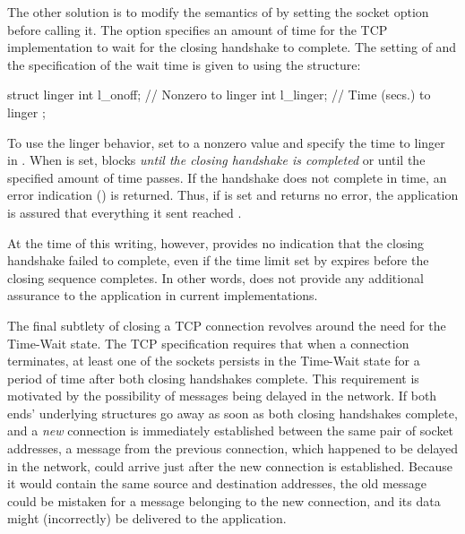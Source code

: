 The other solution is to modify the semantics of 
by setting the  socket option before
calling it.  The  option specifies an amount of time
for the TCP
implementation to wait for the closing handshake to complete.  The
setting of  and the specification
of the wait time is given to  using the
 structure:

\begin{inlinecode}
struct linger {
    int  l_onoff;   // Nonzero to linger
    int  l_linger;  // Time (secs.) to linger
};
\end{inlinecode}

\noindent To use the linger behavior, set  to a
nonzero value and specify the time to linger in .
When  is set,
 blocks \emph{until the
closing handshake is completed\/} or until the specified amount of time
passes.  If the handshake does not complete in time,
an error indication () is returned.
Thus, if  is set and
 returns no error, the
application is assured that everything it sent reached \rque.

At the
time of this writing, however,  provides no indication
that the closing handshake failed to complete, even if the time limit
set by  expires before the closing sequence
completes.  In other words,  does not provide any
additional assurance to the application in current implementations.

The final subtlety of closing a TCP connection revolves around the
need for the Time-Wait state\label{time-wait-state}.  The TCP
specification requires that when a connection terminates, at least one
of the sockets persists in the Time-Wait state for a period of time
after both closing handshakes complete.  This requirement is motivated
by the possibility of messages being delayed in the network.  If both
ends' underlying structures go away as soon as both closing handshakes
complete, and a \emph{new} connection is immediately established
between the same pair of socket addresses, a message from the previous
connection, which happened to be delayed in the network, could arrive
just after the new connection is established.  Because it would
contain the same source and destination addresses, the old message
could be mistaken for a message belonging to the new connection, and
its data might (incorrectly) be delivered to the application.

